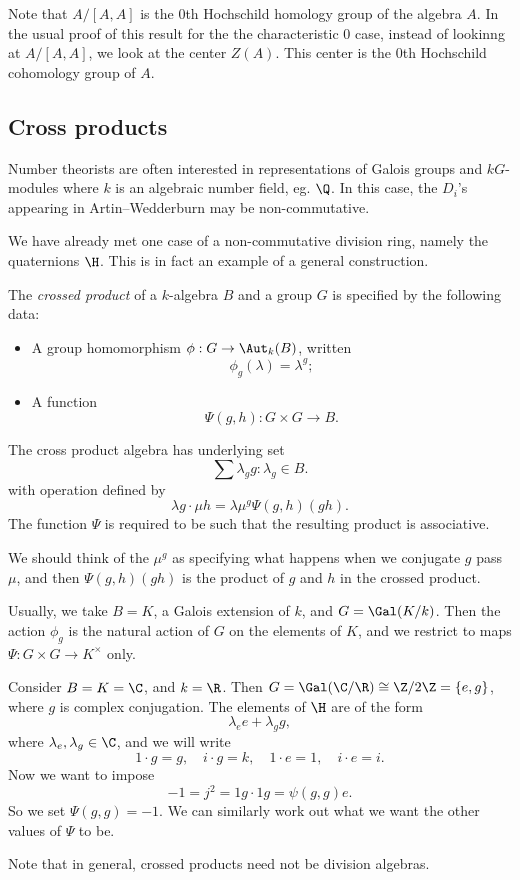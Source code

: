 \documentclass[a4paper]{article}
\begin{document}
Note that $A/[A, A]$ is the $0$th Hochschild homology group of the algebra $A$. In the usual proof of this result for the the characteristic $0$ case, instead of lookinng at $A/[A, A]$, we look at the center $Z(A)$. This center is the $0$th Hochschild cohomology group of $A$.

\subsection{Cross products}
Number theorists are often interested in representations of Galois groups and $kG$-modules where $k$ is an algebraic number field, eg. $\Q$. In this case, the $D_i$'s appearing in Artin--Wedderburn may be non-commutative.

We have already met one case of a non-commutative division ring, namely the quaternions $\H$. This is in fact an example of a general construction.

\begin{defi}
  The \emph{crossed product} of a $k$-algebra $B$ and a group $G$ is specified by the following data:
  \begin{itemize}
    \item A group homomorphism $\phi: G \to \Aut_k(B)$, written
      \[
        \phi_g(\lambda) = \lambda^g;
      \]
    \item A function
      \[
        \Psi(g, h): G \times G \to B.
      \]
  \end{itemize}
  The cross product algebra has underlying set
  \[
    \sum \lambda_g g: \lambda_g \in B.
  \]
  with operation defined by
  \[
    \lambda g \cdot \mu h = \lambda \mu^g \Psi(g, h) (gh).
  \]
  The function $\Psi$ is required to be such that the resulting product is associative.
\end{defi}
We should think of the $\mu^g$ as specifying what happens when we conjugate $g$ pass $\mu$, and then $\Psi(g, h) (gh)$ is the product of $g$ and $h$ in the crossed product.

Usually, we take $B = K$, a Galois extension of $k$, and $G = \Gal(K/k)$. Then the action $\phi_g$ is the natural action of $G$ on the elements of $K$, and we restrict to maps $\Psi: G \times G \to K^\times$ only.

\begin{eg}
  Consider $B = K = \C$, and $k = \R$. Then $G = \Gal(\C/\R) \cong \Z/2\Z = \{e, g\}$, where $g$ is complex conjugation. The elements of $\H$ are of the form
  \[
    \lambda_e e + \lambda_g g,
  \]
  where $\lambda_e, \lambda_g \in \C$, and we will write
  \[
    1 \cdot g = g,\quad i \cdot g = k,\quad 1 \cdot e = 1,\quad i \cdot e = i.
  \]
  Now we want to impose
  \[
    -1 = j^2 = 1g \cdot 1g = \psi(g, g) e.
  \]
  So we set $\Psi(g, g) = -1$. We can similarly work out what we want the other values of $\Psi$ to be. %
\end{eg}
Note that in general, crossed products need not be division algebras.
\end{document}
